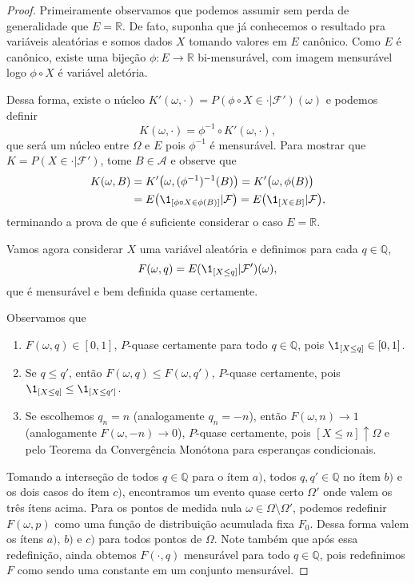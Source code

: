 \begin{proof}
  Primeiramente observamos que podemos assumir sem perda de generalidade que $E = \mathbb{R}$.
  De fato, suponha que já conhecemos o resultado pra variáveis aleatórias e somos dados $X$ tomando valores em $E$ canônico.
  Como $E$ é canônico, existe uma bijeção $\phi:E \to \mathbb{R}$ bi-mensurável, com imagem mensurável logo $\phi \circ X$ é variável aletória.

  Dessa forma, existe o núcleo $K'(\omega, \cdot) = P(\phi \circ X \in \cdot | \mathcal{F}')(\omega)$ e podemos definir
  \begin{equation}
    K(\omega, \cdot) = \phi^{-1} \circ K'(\omega, \cdot),
  \end{equation}
  que será um núcleo entre $\Omega$ e $E$ pois $\phi^{-1}$ é mensurável.
  Para mostrar que $K = P(X \in \cdot|\mathcal{F}')$, tome $B \in \mathcal{A}$ e observe que
  \begin{equation}
    \begin{split}
      K(\omega, B) & = K'\big(\omega, (\phi^{-1})^{-1}(B)\big) = K'\big(\omega, \phi(B)\big)\\
      & = E \big( \1_{[\phi \circ X \in \phi(B)]} | \mathcal{F} \big) = E \big( \1_{[X \in B]} | \mathcal{F} \big),
    \end{split}
  \end{equation}
  terminando a prova de que é suficiente considerar o caso $E = \mathbb{R}$.

  Vamos agora considerar $X$ uma variável aleatória e definimos para cada $q \in \mathbb{Q}$,
  \begin{equation}
    F(\omega, q) = E(\1_{[X \leq q]} | \mathcal{F}')(\omega),
  \end{equation}
  que é mensurável e bem definida quase certamente.

  Observamos que
  \begin{enumerate}[\quad a)]
  \item $F(\omega, q) \in [0,1]$, $P$-quase certamente para todo $q \in \mathbb{Q}$, pois $\1_{[X \leq q]} \in [0,1]$.
  \item Se $q \leq q'$, então $F(\omega, q) \leq F(\omega, q')$, $P$-quase certamente, pois $\1_{[X \leq q]} \leq \1_{[X \leq q']}$.
  \item Se escolhemos $q_n = n$ (analogamente $q_n = -n$), então $F(\omega, n) \to 1$ (analogamente $F(\omega, -n) \to 0$), $P$-quase certamente, pois $[X \leq n] \uparrow \Omega$ e pelo Teorema da Convergência Monótona para esperanças condicionais.
  \end{enumerate}
  Tomando a interseção de todos $q \in \mathbb{Q}$ para o ítem $a)$, todos $q, q' \in \mathbb{Q}$ no ítem $b)$ e os dois casos do ítem $c)$, encontramos um evento quase certo $\Omega'$ onde valem os três ítens acima.
  Para os pontos de medida nula $\omega \in \Omega \setminus \Omega'$, podemos redefinir $F(\omega, p)$ como uma função de distribuição acumulada fixa $F_0$.
  Dessa forma valem os ítens $a)$, $b)$ e $c)$ para todos pontos de $\Omega$.
  Note também que após essa redefinição, ainda obtemos $F(\cdot, q)$ mensurável para todo $q \in \mathbb{Q}$, pois redefinimos $F$ como sendo uma constante em um conjunto mensurável.


\end{proof}
